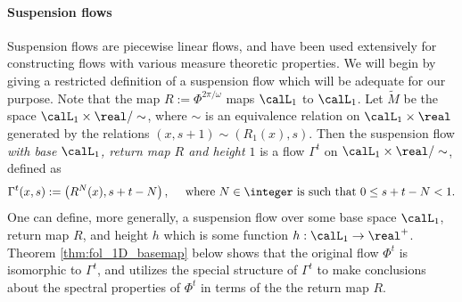 \documentclass[12pt,oneside]{article}
\newcommand{\Return}{R}
\newcommand{\Susp}{\Gamma}
\begin{document}
\paragraph{Suspension flows} Suspension flows are piecewise linear flows, and have been used extensively for constructing flows with various measure theoretic properties. We will begin by giving a restricted definition of a suspension flow which will be adequate for our purpose. Note that the map $\Return := \Phi^{2\pi /\omega}$ maps $\calL_1$ to $\calL_1$.  Let $\tilde{M}$ be the space $\calL_1\times \real / \sim$, where $\sim$ is an equivalence relation on $\calL_1 \times \real$ generated by the relations $(x,s+1)\sim (R_1(x),s)$. Then the suspension flow \emph{with base $\calL_1$, return map $\Return$ and height $1$} is a flow $\Susp^t$ on $\calL_1 \times \real / \sim$, defined as 
%
\begin{equation}\label{eqn:def:susp_flow}
\Susp^t(x,s) := \left( \Return^N(x), s+t-N \right), \quad \mbox{ where } N\in\integer \mbox{ is such that } 0\leq s+t-N<1.
\end{equation}
%
One can define, more generally, a suspension flow over some base space $\calL_1$, return map $\Return$, and height $h$ which is some function $h : \calL_1 \to \real^+$. Theorem \ref{thm:fol_1D_basemap} below shows that the original flow $\Phi^t$ is isomorphic to $\Susp^t$, and utilizes the special structure of $\Susp^t$ to make conclusions about the spectral properties of $\Phi^t$ in terms of the the return map $\Return$. 
\end{document}
